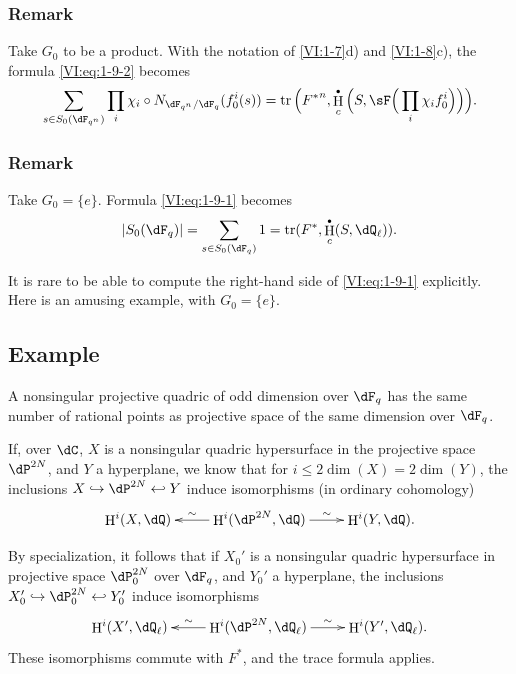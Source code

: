 \documentclass[oneside]{book}
\DeclareMathOperator{\h}{H}
\DeclareMathOperator{\tr}{tr}
\theoremstyle{sga-source}
\theoremstyle{sga-source-dash}
\theoremstyle{sga-source-dotdash}
\theoremstyle{sga-source-number-note-dash}
\theoremstyle{sga-source-note-number-dotdash}
\theoremstyle{sga-source-example-dotdash}
\theoremstyle{sga-source-inline-number}
\theoremstyle{sga-source-bare-number}
\theoremstyle{sga-source}
\let\oldbullet\bullet
\renewcommand{\bullet}{\textnormal{\tiny$\oldbullet$}}
\newcommand{\PrintPage}[1]{}\newcommand{\MathPage}[1]{}\newcommand{\PrintCite}[2]{#1}\newcommand{\var}[3]{#1}
\begin{document}
\addtocounter{subsubsection}{2}
\subsubsection{Remark}\label{VI:1-9-3}

Take $G_0$ to be a product. With the notation of \ref{VI:1-7}d) and 
\ref{VI:1-8}c), the formula \eqref{VI:eq:1-9-2} becomes 
\[
  \sum_{s\in S_0(\dF_{q^n})} \prod_i \chi_i\circ N_{\dF_{q^n}/\dF_q} (f_0^i(s)) = \tr\Big({F^\ast}^n, \h_c^\bullet\Big(S,\sF\Big(\prod_i \chi_i f_0^i\Big)\Big)\Big) \text{.}
\]





\subsubsection{Remark}\label{VI:1-9-4}

Take $G_0=\{e\}$. Formula \eqref{VI:eq:1-9-1} becomes 
\[
  \left|S_0(\dF_q)\right| = \sum_{s\in S_0(\dF_q)} 1 = \tr(F^\ast,\h_c^\bullet(S,\dQ_\ell)) \text{.}
\]

It is rare to be able to compute the right-hand side of 
\eqref{VI:eq:1-9-1} explicitly. Here is an amusing example, with $G_0=\{e\}$. 





\PrintPage{175}
\subsection{Example}\label{VI:1-10}

A nonsingular projective quadric of odd dimension over \texorpdfstring{$\dF_q$}{Fq} has the same number of rational points as projective space of the same dimension over \texorpdfstring{$\dF_q$}{Fq}.

If, over $\dC$, $X$ is a nonsingular quadric hypersurface in 
the projective space $\dP^{2 N}$, and $Y$ a hyperplane, we know that for 
$i\leqslant 2\dim(X)=2\dim(Y)$, the inclusions 
$X\hookrightarrow \dP^{2 N}\hookleftarrow Y$ induce isomorphisms (in 
ordinary cohomology) 
\[\xymatrix{
  \h^i(X,\dQ) 
    & \ar[l]_-\sim \h^i(\dP^{2 N},\dQ) \ar[r]^-\sim 
    & \h^i(Y,\dQ) \text{.}
}\]

By specialization, it follows that if $X_0'$ is a nonsingular quadric 
hypersurface in projective space $\dP_0^{2 N}$ over $\dF_q$, 
and $Y_0'$ a hyperplane, the inclusions 
$X_0'\hookrightarrow \dP_0^{2 N}\hookleftarrow Y_0'$ induce 
isomorphisms 
\[\xymatrix{
  \h^i(X',\dQ_\ell) 
    & \ar[l]_-\sim \h^i(\dP^{2 N},\dQ_\ell) \ar[r]^-\sim 
    & \h^i(Y',\dQ_\ell) \text{.}
}\]
These isomorphisms commute with $F^\ast$, and the trace formula applies. 
\end{document}
